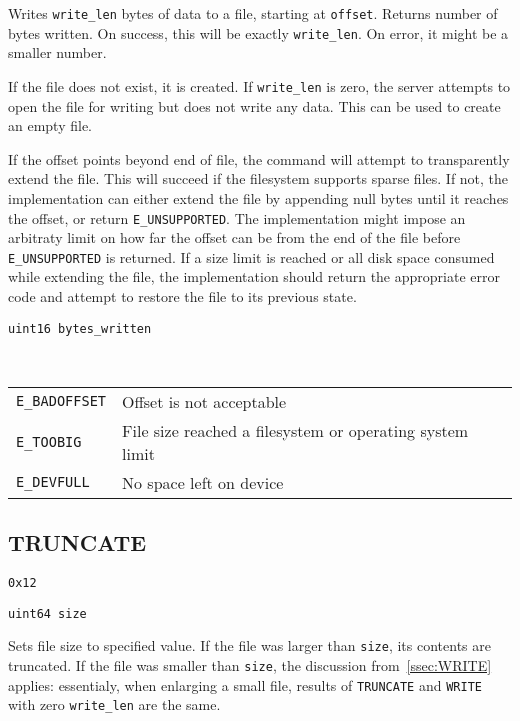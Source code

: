 Writes {\tt write\_len} bytes of data to a file, starting at {\tt offset}. Returns number of bytes written. On
success, this will be exactly {\tt write\_len}. On error, it might be a smaller number.

If the file does not exist, it is created. If {\tt write\_len} is zero, the server attempts to open the file
for writing but does not write any data. This can be used to create an empty file.

If the offset points beyond end of file, the command will attempt to transparently extend the file. This will
succeed if the filesystem supports sparse files. If not, the implementation can either extend the file by
appending null bytes until it reaches the offset, or return {\tt E\_UNSUPPORTED}. The implementation might
impose an arbitraty limit on how far the offset can be from the end of the file before {\tt E\_UNSUPPORTED} is
returned. If a size limit is reached or all disk space consumed while extending the file, the implementation
should return the appropriate error code and attempt to restore the file to its previous state.

\begin{description}[noitemsep,topsep=1pt]
	\item[Result data:] {\tt uint16 bytes\_written}
	\item[Specific errors:] \hfill \\
		\begin{tabular}{lp{10.5cm}}
			{\tt E\_BADOFFSET} & Offset is not acceptable \\
			{\tt E\_TOOBIG} & File size reached a filesystem or operating system limit \\
			{\tt E\_DEVFULL} & No space left on device
		\end{tabular}
\end{description}

\subsection{TRUNCATE}

\begin{description}[noitemsep,topsep=1pt]
	\item[Code:] {\tt 0x12}
	\item[Arguments:] {\tt uint64 size}
\end{description}

Sets file size to specified value. If the file was larger than {\tt size}, its contents are truncated. If the
file was smaller than {\tt size}, the discussion from~\ref{ssec:WRITE} applies: essentialy, when enlarging
a small file, results of {\tt TRUNCATE} and {\tt WRITE} with zero {\tt write\_len} are the same.

